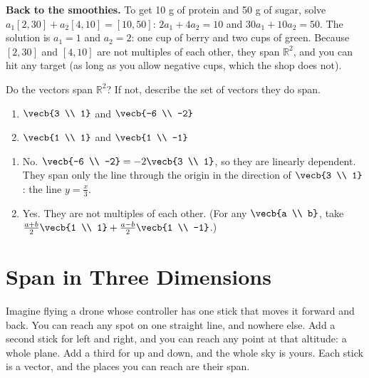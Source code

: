 \textbf{Back to the smoothies.} To get 10 g of protein and 50 g of sugar,
solve $a_1[2, 30] + a_2[4, 10] = [10, 50]$: $2a_1 + 4a_2 = 10$ and $30a_1
+ 10a_2 = 50$. The solution is $a_1 = 1$ and $a_2 = 2$: one cup of berry
and two cups of green. Because $[2, 30]$ and $[4, 10]$ are not multiples
of each other, they span $\mathbb{R}^2$, and you can hit any target (as
long as you allow negative cups, which the shop does not).

\begin{Exercise}[title={Span or Not?}, label=lc_span]
Do the vectors span $\mathbb{R}^2$? If not, describe the set of vectors
they do span.
\begin{enumerate}
\item $\vecb{3 \\ 1}$ and $\vecb{-6 \\ -2}$
\item $\vecb{1 \\ 1}$ and $\vecb{1 \\ -1}$
\end{enumerate}
\end{Exercise}
\begin{Answer}[ref=lc_span]
\begin{enumerate}
\item No. $\vecb{-6 \\ -2} = -2\vecb{3 \\ 1}$, so they are linearly
dependent. They span only the line through the origin in the direction of
$\vecb{3 \\ 1}$: the line $y = \frac{x}{3}$.
\item Yes. They are not multiples of each other. (For any $\vecb{a \\ b}$,
take $\frac{a + b}{2}\vecb{1 \\ 1} + \frac{a - b}{2}\vecb{1 \\ -1}$.)
\end{enumerate}
\end{Answer}

\section{Span in Three Dimensions}
Imagine flying a drone whose controller has one stick that moves it
forward and back. You can reach any spot on one straight line, and nowhere
else. Add a second stick for left and right, and you can reach any point
at that altitude: a whole plane. Add a third for up and down, and the
whole sky is yours. Each stick is a vector, and the places you can reach
are their span.

